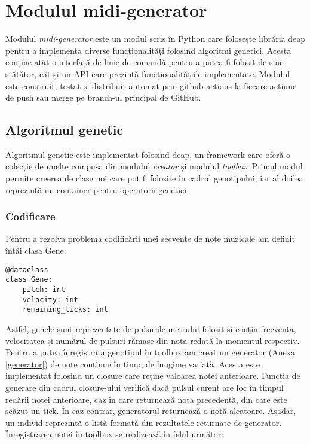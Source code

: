        
\section{Modulul midi-generator}
    \noindent Modulul \textit{midi\hyphen generator} este un modul scris în Python care folosește librăria deap \cite{deap} pentru a implementa diverse funcționalități folosind algoritmi genetici. Acesta conține atât o interfață de linie de comandă pentru a putea fi folosit de sine stătător, cât și un API care prezintă funcționalitățiile implementate. Modulul este construit, testat și distribuit automat prin github actions la fiecare acțiune de push sau merge pe branch-ul principal de GitHub.
        
    \subsection{Algoritmul genetic}
        \noindent Algoritmul genetic este implementat folosind deap, un framework care oferă o colecție de unelte compusă din modulul \textit{creator} și modulul \textit{toolbox}. Primul modul permite creerea de clase noi care pot fi folosite în cadrul genotipului, iar al doilea reprezintă un container pentru operatorii genetici. \par
        \subsubsection{Codificare}
            \noindent Pentru a rezolva problema codificării unei secvențe de note muzicale am definit întâi clasa Gene:

            \begin{verbatim}
@dataclass
class Gene:
    pitch: int
    velocity: int
    remaining_ticks: int
            \end{verbatim}

            \noindent Astfel, genele sunt reprezentate de pulsurile metrului folosit și conțin frecvența, velocitatea și numărul de pulsuri rămase din nota redată la momentul respectiv. Pentru a putea înregistrata genotipul în toolbox am creat un generator (Anexa \ref{generator}) de note continue în timp, de lungime variată. Acesta este implementat folosind un closure care reține valoarea notei anterioare. Funcția de generare din cadrul closure-ului verifică dacă pulsul curent are loc în timpul redării notei anterioare, caz în care returnează nota precedentă, din care este scăzut un tick. În caz contrar, generatorul returnează o notă aleatoare. Așadar, un individ reprezintă o listă formată din rezultatele returnate de generator. Înregistrarea notei în toolbox se realizează în felul următor:
            
